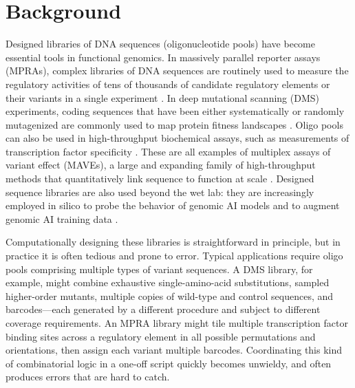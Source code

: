 \documentclass[pdflatex,sn-vancouver-num,referee,lineno,oneside]{sn-jnl}
\begin{document}
\maketitle

\section{Background}\label{sec:background}

Designed libraries of DNA sequences (oligonucleotide pools) have become essential tools in functional genomics. In massively parallel reporter assays (MPRAs), complex libraries of DNA sequences are routinely used to measure the regulatory activities of tens of thousands of candidate regulatory elements or their variants in a single experiment \citep{Patwardhan2009cw, Kinney2010tn, Melnikov2012dw, Kwasnieski2012hu, Sharon2012io, Mogno2013cf, Levo2014hl, Inoue2015cs, Vvedenskaya2015ih, Urtecho2018hu, Klein2020, Romero2023, LaFleur2024aa}. In deep mutational scanning (DMS) experiments, coding sequences that have been either systematically or randomly mutagenized are commonly used to map protein fitness landscapes \citep{Fowler2010gt, Hietpas2011bp, Fowler2014gq, Olson2014iq, Adams2016dka, Findlay2018kd, Starr2020aa}. Oligo pools can also be used in high-throughput biochemical assays, such as measurements of transcription factor specificity \citep{Berger2006wp, Maerkl2007tv, Noyes2008vr, Gordan2013, Le2018cr, Shen2018ip, Khetan2025_paditseq}. These are all examples of multiplex assays of variant effect (MAVEs), a large and expanding family of high-throughput methods that quantitatively link sequence to function at scale \citep{Kinney2019jc, Starita2017ec, Weile2018gm}. Designed sequence libraries are also used beyond the wet lab: they are increasingly employed in silico to probe the behavior of genomic AI models \citep{Avsec2021bpnet, Toneyan2024creme, Seitz2024squid, Seitz2025, Nagai2026review} and to augment genomic AI training data \citep{Lee2023}.

Computationally designing these libraries is straightforward in principle, but in practice it is often tedious and prone to error. Typical applications require oligo pools comprising multiple types of variant sequences. A DMS library, for example, might combine exhaustive single-amino-acid substitutions, sampled higher-order mutants, multiple copies of wild-type and control sequences, and barcodes---each generated by a different procedure and subject to different coverage requirements. An MPRA library might tile multiple transcription factor binding sites across a regulatory element in all possible permutations and orientations, then assign each variant multiple barcodes. Coordinating this kind of combinatorial logic in a one-off script quickly becomes unwieldy, and often produces errors that are hard to catch.
\end{document}
